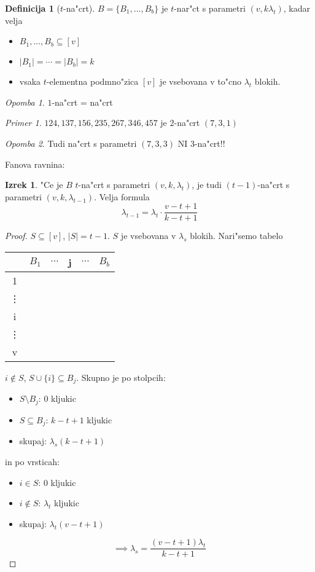 \documentclass[a4paper,12pt]{article}
\theoremstyle{definition}
\newtheorem{defn}[counter]{Definicija}
\newtheorem{theorem}[counter]{Izrek}
\theoremstyle{remark}
\newtheorem*{ex}{Primer}
\newtheorem*{rem}{Opomba}
\begin{document}
\begin{defn}[$t$-na"crt]
	$B = \{B_1, \ldots, B_b\}$ je $t$-nar"ct s parametri $(v, k \lambda_t)$, kadar velja
	\begin{itemize}
		\item $B_1, \ldots, B_b \subseteq [v]$
		\item $|B_1| = \cdots = |B_b| = k$
		\item vsaka $t$-elementna podmno"zica $[v]$ je vsebovana v to"cno $\lambda_t$ blokih.
	\end{itemize}
\end{defn}
\begin{rem}
	$1$-na"crt = na"crt
\end{rem}
\begin{ex}
	$124, 137, 156, 235, 267, 346, 457$ je $2$-na"crt $(7, 3, 1)$
\end{ex}
\begin{rem}
	Tudi na"crt s parametri $(7, 3, 3)$ NI $3$-na"crt!!
\end{rem}

Fanova ravnina:
\label{TODO: add image 4}

\begin{theorem}
	"Ce je $B$ $t$-na"crt s parametri $(v, k, \lambda_t)$, je tudi $(t-1)$-na"crt s parametri $(v, k, \lambda_{t-1})$. Velja formula
	\[\lambda_{t-1} = \lambda_t \cdot \frac{v - t + 1}{k - t + 1}\]
\end{theorem}

\begin{proof}
	$S \subseteq [v]$, $|S| = t - 1$. $S$ je vsebovana v $\lambda_s$ blokih.
	Nari"semo tabelo
	\begin{center}
		\begin{tabular}{c|c c c c c}
		     & $B_1$ & $\cdots$ & j & $\cdots$ & $B_b$ \\
		\hline
		     1 \\
		     \vdots \\
		     i & & & \checkmark\\
		     \vdots \\
		     v
		\end{tabular}
	\end{center}
	$i \notin S$, $S \cup \{i\} \subseteq B_j$. Skupno je po stolpcih:
	\begin{itemize}
	    \item $S\setminus B_j$: $0$ kljukic
	    \item $S \subseteq B_j$: $k-t+1$ kljukic
	    \item[] skupaj: $\lambda_s (k-t+1)$
	\end{itemize}
	in po vrsticah:
	\begin{itemize}
	    \item $i\in S$: $0$ kljukic
	    \item $i\notin S$: $\lambda_t$ kljukic
	    \item[] skupaj: $\lambda_t (v-t+1)$
	\end{itemize}
	
	\[\implies \lambda_s = \frac{(v - t + 1)\lambda_t}{k-t+1}\]
\end{proof}
\end{document}
